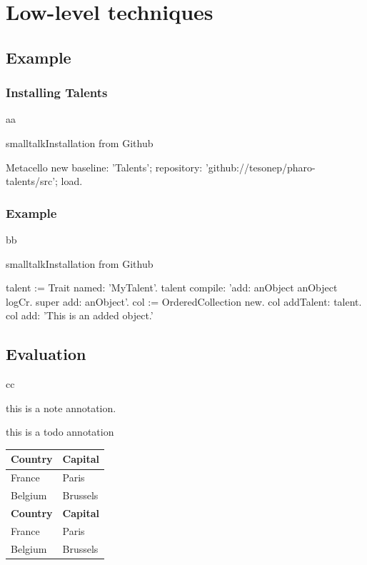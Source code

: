 \documentclass[10pt,twoside,english]{_support/latex/sbabook/sbabook}
\begin{document}
\chapter{Low-level techniques}\section{Example}\subsection{Installing Talents}
aa

\begin{listing}[float, label=install]{smalltalk}{Installation from Github}

Metacello new
  baseline: 'Talents';
  repository: 'github://tesonep/pharo-talents/src';
  load.
\end{listing}
\subsection{Example}
bb

\begin{listing}[float, label=talent-example]{smalltalk}{Installation from Github}

talent := Trait named: 'MyTalent'.
talent compile: 'add: anObject
anObject logCr.
super add: anObject'.
col := OrderedCollection new.
col addTalent: talent.
col add: 'This is an added object.'
\end{listing}
\section{Evaluation}
cc

\begin{note}
this is a note annotation.
\end{note}

\begin{todo}
this is a todo annotation
\end{todo}

\begin{tabular}{ll}
\toprule
\textbf{Country} & \textbf{Capital} \\
\midrule
France & Paris \\
Belgium & Brussels \\
\textbf{Country} & \textbf{Capital} \\
\midrule
France & Paris \\
Belgium & Brussels \\
\bottomrule
\end{tabular}
\end{document}
